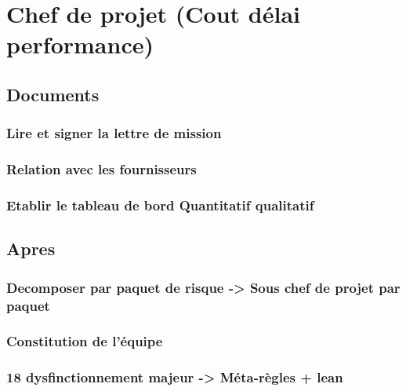 

\section{Chef de projet (Cout délai performance)}
	\subsection{Documents}
		\subsubsection{Lire et signer la lettre de mission}
		\subsubsection{Relation avec les fournisseurs}
		\subsubsection{Etablir le tableau de bord Quantitatif qualitatif}

	\subsection{Apres}
		\subsubsection{Decomposer par paquet de risque -> Sous chef de projet par paquet}
		\subsubsection{Constitution de l'équipe}
		\subsubsection{18 dysfinctionnement majeur -> Méta-règles + lean}


